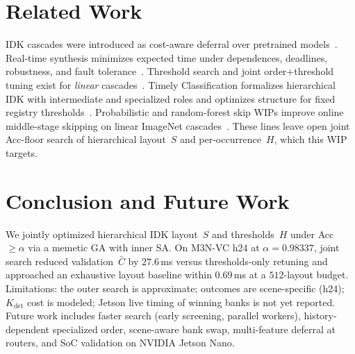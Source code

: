 \documentclass[conference]{IEEEtran}
\begin{document}
\section{Related Work}
IDK cascades were introduced as cost-aware deferral over pretrained models~\cite{wang2018idk}.
Real-time synthesis minimizes expected time under dependences, deadlines, robustness, and fault tolerance~\cite{abdelzaher2023scheduling,baruah2021optimal,baruah2023robust,baruah2024fault}.
Threshold search and joint order+threshold tuning exist for \emph{linear} cascades~\cite{chellapilla2006combining,markatopoulou2016ordering,li2025restoreml}.
Timely Classification formalizes hierarchical IDK with intermediate and specialized roles and optimizes structure for fixed registry thresholds~\cite{baruah2025timely}.
Probabilistic and random-forest skip WIPs improve online middle-stage skipping on linear ImageNet cascades~\cite{nguyen2024probabilistic,katikaneni2025rfskip}.
These lines leave open joint Acc-floor search of hierarchical layout~$S$ and per-occurrence~$H$, which this WIP targets.

\section{Conclusion and Future Work}
We jointly optimized hierarchical IDK layout~$S$ and thresholds~$H$ under Acc~$\ge\alpha$ via a memetic GA with inner SA.
On M3N-VC h24 at $\alpha{=}0.98337$, joint search reduced validation~$\bar{C}$ by $27.6$\,ms versus thresholds-only retuning and approached an exhaustive layout baseline within $0.69$\,ms at a $512$-layout budget.
Limitations: the outer search is approximate; outcomes are scene-specific (h24); $K_{\mathrm{det}}$ cost is modeled; Jetson live timing of winning banks is not yet reported.
Future work includes faster search (early screening, parallel workers), history-dependent specialized order, scene-aware bank swap, multi-feature deferral at routers, and SoC validation on NVIDIA Jetson Nano.



\end{document}
